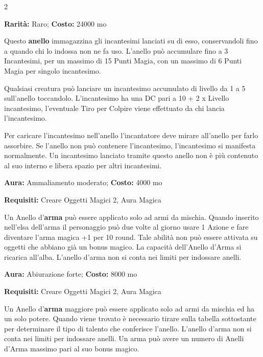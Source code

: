 \begin{multicols}{2}
\medskip


\textbf{Rarità:} Raro; \textbf{Costo:} 24000 mo

Questo \textbf{anello} immagazzina gli incantesimi lanciati su di esso, conservandoli fino a quando chi lo indossa non ne fa uso. L'anello può accumulare fino a 3 Incantesimi, per un massimo di 15 Punti Magia, con un massimo di 6 Punti Magia per singolo incantesimo.

Qualsiasi creatura può lanciare un incantesimo accumulato di livello da 1 a 5 sull'anello toccandolo. L'incantesimo ha una DC pari a 10 + 2 x Livello incantesimo, l'eventuale Tiro per Colpire viene effettuato da chi lancia l'incantesimo.

Per caricare l'incantesimo nell'anello l'incantatore deve mirare all'anello per farlo assorbire. Se l'anello non può contenere l'incantesimo, l'incantesimo si manifesta normalmente. Un incantesimo lanciato tramite questo anello non è più contenuto al suo interno e libera spazio per altri incantesimi.


\textbf{Aura:} Ammaliamento moderato; \textbf{Costo:} 4000 mo

\textbf{Requisiti:} Creare Oggetti Magici 2, Aura Magica

Un Anello d'\textbf{arma} può essere applicato solo ad armi da mischia. Quando inserito nell'elsa dell'arma il personaggio può due volte al giorno usare 1 Azione e fare diventare l'arma magica +1 per 10 round. Tale abilità non può essere attivata su oggetti che abbiano già un bonus magico.
La capacità dell'Anello d'Arma si ricarica all'alba. L'anello d'arma non si conta nei limiti per indossare anelli.


\textbf{Aura:} Abiurazione forte; \textbf{Costo:} 8000 mo

\textbf{Requisiti:} Creare Oggetti Magici 2, Aura Magica

Un Anello d'\textbf{arma} maggiore può essere applicato solo ad armi da mischia ed ha un solo potere. Quando viene trovato è necessario tirare sulla tabella sottostante per determinare il tipo di talento che conferisce l'anello. L'anello d'arma non si conta nei limiti per indossare anelli. Un arma può avere un numero di Anelli d'Arma massimo pari al suo bonus magico.

\medskip


\end{multicols}
